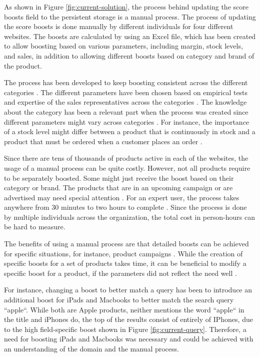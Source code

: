 As shown in Figure \ref{fig:current-solution}, the process behind updating the 
score boosts field to the persistent storage is a manual process.
The process of updating the score boosts is done manually by different individuals for four different websites.
The boosts are calculated by using an Excel file, which has been created to allow boosting based on 
various parameters, including margin, stock levels, and sales, in addition to allowing
different boosts based on category and brand of the product.


The process has been developed to keep boosting consistent across the different categories 
\cite{searchSurvey}.
The different parameters have been chosen based on empirical tests and  
expertise of the sales representatives across the categories \cite{searchSurvey}.
The knowledge about the category has been a relevant part when the process was created
since different parameters might vary across categories \cite{searchSurvey}.
For instance, the importance of a stock level might differ between a product that is 
continuously in stock and a product that must be ordered when a customer places an order
\cite{searchSurvey}.


Since there are tens of thousands of products active in each of the websites, the usage of a manual
process can be quite costly. 
However, not all products require to be separately boosted.
Some might just receive the boost based on their category or brand. 
The products that are in an upcoming campaign or are advertised may need special attention
\cite{searchSurvey}.
For an expert user, the process takes anywhere from 30 minutes to two hours to complete \cite{searchSurvey}.
Since the process is done by multiple individuals across the organization, the total
cost in person-hours can be hard to measure.


The benefits of using a manual process are that detailed
boosts can be achieved for specific situations, for instance, product campaigns \cite{relevantSearch}.
While the creation of specific boosts for a set of products takes time, it can be beneficial
to modify a specific boost for a product, if the parameters did not reflect the need well
\cite{searchSurvey}.


For instance, changing a boost to better match a query has been to introduce
an additional boost for iPads and Macbooks to better match the search query ``apple``.
While both are Apple products, neither mentions the word ``apple`` in the title and
iPhones do, the top of the results consist of entirely of IPhones, 
due to the high field-specific boost shown in Figure \ref{fig:current-query}.
Therefore, a need for boosting iPads and Macbooks was necessary and could be achieved with
an understanding of the domain and the manual process. \cite{searchSurvey}


